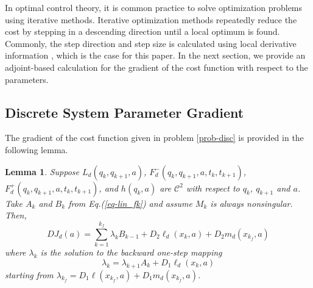 \documentclass[letterpaper, 10pt, conference]{ieeeconf}
\newtheorem{lemma}{Lemma}
\begin{document}
In optimal control theory, it is common practice to solve optimization problems using iterative methods.  Iterative optimization methods repeatedly reduce the cost by stepping in a descending direction until a local optimum is found.  Commonly, the step direction and step size is calculated using local derivative information \cite{armijo, kelley}, which is the case for this paper.  In the next section, we provide an adjoint-based calculation for the gradient of the cost function with respect to the parameters.

\subsection{Discrete System Parameter Gradient}
The gradient of the cost function given in problem \ref{prob-disc} is provided in the following lemma.
\begin{lemma}
\label{lem-grad_a}
Suppose $L_d(q_k,q_{k+1},a)$, $F_d^-(q_k,q_{k+1},a,t_k,t_{k+1})$, $F_d^+(q_k,q_{k+1},a,t_k,t_{k+1})$, and $h(q_k,a)$ are $\mathcal{C}^2$ with respect to $q_k$, $q_{k+1}$ and $a$.  Take $A_k$ and $B_k$ from Eq.(\ref{eq-lin_fk}) and assume $M_k$ is always nonsingular.  Then,
\begin{equation}
DJ_d(a) = \sum_{k = 1}^{k_f}\lambda_kB_{k-1} +D_2\ell_d(x_k,a) + D_2m_d(x_{k_f},a)
\label{eq-DJa}
\end{equation}
where $\lambda_k$ is the solution to the backward one-step mapping
\begin{equation}
\lambda_k = \lambda_{k+1}A_{k} + D_1\ell_d(x_{k},a) 
\label{eq-lambda}
\end{equation}
starting from $\lambda_{k_f} = D_1\ell(x_{k_f},a) + D_1m_d(x_{k_f},a)$.  
\end{lemma}
\end{document}
